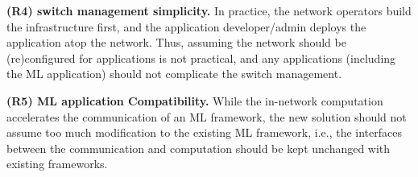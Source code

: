 \textbf{(R4) switch management simplicity.} In practice, the network operators build the infrastructure first, and the application developer/admin deploys the application atop the network. Thus, assuming the network should be (re)configured for applications is not practical, and any applications (including the ML application) should not complicate the switch management.


\textbf{(R5) ML application Compatibility.} While the in-network computation accelerates the communication of an ML framework, the new solution should not assume too much modification to the existing ML framework, i.e., the interfaces between the communication and computation should be kept unchanged with existing frameworks.













